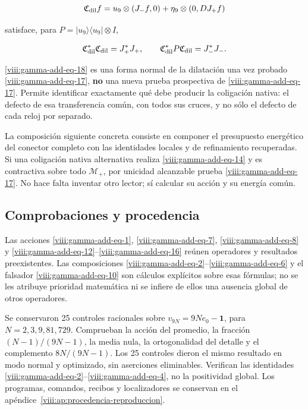 \begin{equation}
\mathfrak C_{\rm dil}f
=u_9\otimes(J_-f,0)+\eta_9\otimes(0,DJ_+f)
\label{viii:gamma-add-eq-18}
\end{equation}

satisface, para \(P=|u_9\rangle\langle u_9|\otimes I\),

\begin{equation}
\mathfrak C_{\rm dil}^*\mathfrak C_{\rm dil}=J_+^*J_+,\qquad
\mathfrak C_{\rm dil}^*P\mathfrak C_{\rm dil}=J_-^*J_-.
\label{viii:gamma-add-display-37}
\end{equation}

\eqref{viii:gamma-add-eq-18} es una forma normal de la dilatación una vez probado \eqref{viii:gamma-add-eq-17}, \textbf{no} una nueva prueba prospectiva de \eqref{viii:gamma-add-eq-17}. Permite identificar exactamente qué debe producir la coligación nativa: el defecto de esa transferencia común, con todos sus cruces, y no sólo el defecto de cada reloj por separado.

La composición siguiente concreta consiste en componer el presupuesto energético del conector completo con las identidades locales y de refinamiento recuperadas. Si una coligación nativa alternativa realiza \eqref{viii:gamma-add-eq-14} y es contractiva sobre todo \(\mathcal M_+\), por unicidad alcanzable prueba \eqref{viii:gamma-add-eq-17}. No hace falta inventar otro lector; sí calcular su acción y su energía común.

\subsection{Comprobaciones y procedencia}
\label{viii:gamma-add-sub-412}

Las acciones \eqref{viii:gamma-add-eq-1}, \eqref{viii:gamma-add-eq-7},
\eqref{viii:gamma-add-eq-8} y \eqref{viii:gamma-add-eq-12}--\eqref{viii:gamma-add-eq-16}
reúnen operadores y resultados preexistentes. Las composiciones
\eqref{viii:gamma-add-eq-2}--\eqref{viii:gamma-add-eq-6} y el falsador
\eqref{viii:gamma-add-eq-10} son cálculos explícitos sobre esas fórmulas;
no se les atribuye prioridad matemática ni se infiere de ellos una
ausencia global de otros operadores.

Se conservaron 25 controles racionales sobre
\(v_{9N}=9Ne_0-\mathbf1\), para \(N=2,3,9,81,729\).
Comprueban la acción del promedio, la fracción \((N-1)/(9N-1)\),
la media nula, la ortogonalidad del detalle y el complemento
\(8N/(9N-1)\). Los 25 controles dieron el mismo resultado en modo
normal y optimizado, sin aserciones eliminables. Verifican las identidades
\eqref{viii:gamma-add-eq-2}--\eqref{viii:gamma-add-eq-4}, no la positividad global.
Los programas, comandos, recibos y localizadores se conservan en el
apéndice~\ref{viii:ap:procedencia-reproduccion}.

